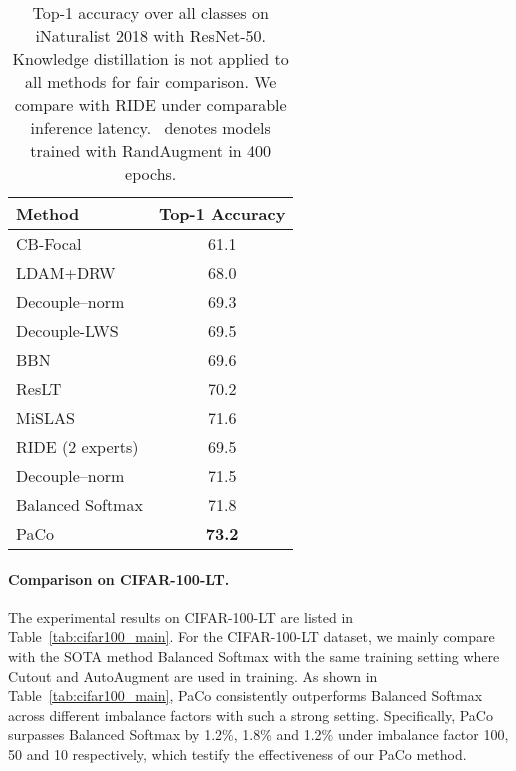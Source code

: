 \documentclass[10pt,twocolumn,letterpaper]{article}
\begin{document}
\begin{table}
	\centering
	\caption{Top-1 accuracy over all classes on iNaturalist 2018 with ResNet-50. Knowledge distillation is not applied to all methods for fair comparison. We compare with RIDE {\protect\footnotemark} under comparable inference latency. \dag~denotes models trained with RandAugment \cite{DBLP:conf/nips/CubukZS020} in 400 epochs.}
	\label{tab:inat_main}
	\resizebox{.66\linewidth}{!}
	{
		\begin{tabular}{lc}
			\toprule
			Method & Top-1 Accuracy \\
			\midrule
			CB-Focal & 61.1 \\
			LDAM+DRW                   & 68.0 \\
			Decouple--norm       & 69.3 \\
			Decouple-LWS               & 69.5 \\
			BBN                        & 69.6 \\
			ResLT                      & 70.2 \\
			MiSLAS                     & 71.6 \\
			\midrule
			RIDE (2 experts) \dag         & 69.5  \\
			Decouple--norm \dag     & 71.5 \\
			Balanced Softmax \dag         & 71.8 \\
			PaCo \dag                     & \textbf{73.2} \\
			\bottomrule
		\end{tabular}
	}
\end{table}

\vspace{-.1in}
\paragraph{Comparison on CIFAR-100-LT.}
The experimental results on CIFAR-100-LT are listed in Table~\ref{tab:cifar100_main}. For the CIFAR-100-LT dataset, we mainly compare with the SOTA method Balanced Softmax \cite{DBLP:conf/nips/RenYSMZYL20} with the same training setting where Cutout \cite{DBLP:journals/corr/abs-1708-04552} and AutoAugment \cite{DBLP:conf/cvpr/CubukZMVL19} are used in training. As shown in Table~\ref{tab:cifar100_main}, PaCo consistently outperforms Balanced Softmax across different imbalance factors with such a strong setting. Specifically, PaCo surpasses Balanced Softmax by 1.2\%, 1.8\% and 1.2\% under imbalance factor 100, 50 and 10 respectively, which testify the effectiveness of our PaCo method.
\end{document}
